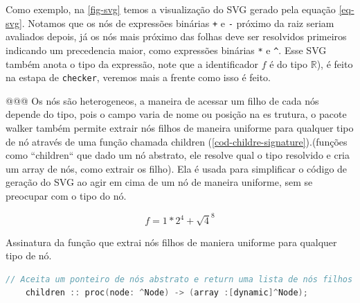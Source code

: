 Como exemplo, na \autoref{fig-svg} temos a visualização do SVG gerado pela equação \autoref{eq-svg}. Notamos que os nós de expressões binárias \texttt{+} e \texttt{-} próximo da raiz seriam avaliados depois, já os nós mais próximo das folhas deve ser resolvidos primeiros indicando um precedencia maior, como expressões binárias \texttt{*} e \texttt{\^}. Esse SVG também anota o tipo da expressão, note que a identificador $f$ é do tipo $\mathbb{R}$), é feito na estapa de \texttt{checker}, veremos mais a frente como isso é feito.
 

@@@
Os nós são heterogeneos, a maneira de acessar um filho de cada nós depende do tipo, pois o campo varia de nome ou posição na es trutura, o pacote walker também permite extrair nós filhos de maneira uniforme para qualquer tipo de nó através de uma função chamada children (\autoref{cod-childre-signature}).(funções como ``children`` que dado um nó abstrato, ele resolve qual o tipo resolvido e cria um array de nós, como extrair os filho). Ela é usada para simplificar o código de geração do SVG ao agir em cima de um nó de maneira uniforme, sem se preocupar com o tipo do nó.

\begin{equation} \label{eq-svg}
   f =  1*2 ^ 4 +  \sqrt 4^8
\end{equation}


\begin{codigo}[htb]
        \caption{\small Assinatura da função que extrai nós filhos de maniera uniforme para qualquer tipo de nó. }
        \label{cod-childre-signature}
  \begin{lstlisting}[language = C]
    // Aceita um ponteiro de nós abstrato e return uma lista de nós filhos
    children :: proc(node: ^Node) -> (array :[dynamic]^Node);
  \end{lstlisting}
\end{codigo}

